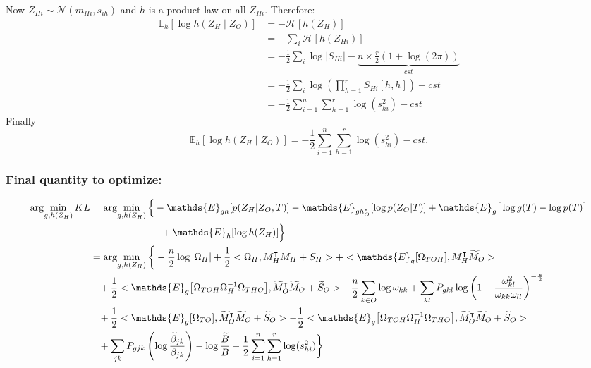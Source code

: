 \documentclass[11pt,a4paper]{article}
\newcommand{\argmin}{\arg\!\min}
\newcommand{\Esp}{\mathds{E}}
\newcommand{\entr}{\mathcal{H}}
\begin{document}
Now $Z_{Hi} \sim \mathcal{N}(m_{Hi},s_{ih})$ and $h$ is a product law on all $Z_{Hi}$. Therefore: 
\begin{align*}
\Esp_h[\log h(Z_H\mid Z_O)]  &= - \entr[h(Z_H)] \\
&= -\sum_i \entr[h(Z_{Hi})] \\
&=-\frac{1}{2} \sum_i\log |S_{Hi}| -\underbrace{n\times  \frac{r}{2}(1+\log(2\pi))}_{cst}\\
&= -\frac{1}{2} \sum_i \log \left(\prod_{h=1}^r S_{Hi}[h,h] \right)-cst\\
&= -\frac{1}{2}\sum_{i=1}^n \sum_{h=1}^r \log(s_{hi}^2)-cst
\end{align*}
Finally $$\boxed{ \Esp_h[\log h(Z_H\mid Z_O)] = -\frac{1}{2}\sum_{i=1}^n \sum_{h=1}^r \log(s_{hi}^2) -cst}.$$

\subsubsection{Final quantity to optimize:}
\begin{align*}
\argmin_{g,h(Z_H)} KL  &=\argmin_{g,h(Z_H)}  \Big\{- \Esp_{gh}[ p(Z_H|Z_O,T)] - \Esp_{gh_O^*}[\log p(Z_O|T)] + \Esp_g\big[\log g(T)-\log p(T)\big]\\
& \hspace{2.5cm} + \Esp_h[\log h(Z_H)]  \Big\}\\
&= \argmin_{g,h(Z_H)}  \bigg\{ -\frac{n}{2} \log |\Omega_H| + \frac{1}{2}<\Omega_H, M_H^\intercal M_H + S_H> + <\Esp_g[\Omega_{TOH}],M_H^\intercal \widetilde{M}_O> \\
& \;\;\;+ \frac{1}{2}<\Esp_g\big[\Omega_{TOH}\Omega_H^{-1}\Omega_{THO}\big],\widetilde{M}_O^\intercal \widetilde{M}_ O + \widetilde{S}_ O> -\frac{n}{2}\sum_{k\in O} \log \omega_{kk}+\sum _{kl} P_{gkl}  \log\left(1- \frac{ \omega_{kl}^2}{\omega_{kk}\omega_{ll}}\right)^{-\frac{n}{2}} \\
&  \;\;\;+ \frac{1}{2}<\Esp_g[\Omega_{TO}],\widetilde{M}_O^\intercal \widetilde{M}_O + \widetilde{S}_O> - \frac{1}{2}<\Esp_g\big[\Omega_{TOH}\Omega_H^{-1}\Omega_{THO}\big],\widetilde{M}_O^\intercal \widetilde{M}_O + \widetilde{S}_O> \\
& \;\;\; + \sum_{jk}P_{gjk} \left(\log \frac{\widetilde{\beta}_{jk}}{{\beta}_{jk}}\right) - \log \frac{\widetilde{B}}{B} -\frac{1}{2}\sum_{i=1}^n \sum_{h=1}^r \log(s_{hi}^2)\bigg\}
\end{align*}
\end{document}
